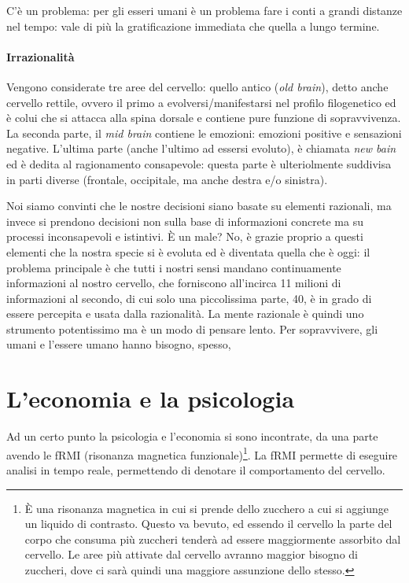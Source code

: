 C'è un problema: per gli esseri umani è un problema fare i conti a grandi
distanze nel tempo: vale di più la gratificazione immediata che quella a lungo
termine.

\paragraph*{Irrazionalità} Vengono considerate tre aree del cervello: quello
antico (\textit{old brain}), detto anche cervello rettile, ovvero il primo a
evolversi/manifestarsi nel profilo filogenetico ed è colui che si attacca alla
spina dorsale e contiene pure funzione di sopravvivenza. La seconda parte, il
\textit{mid brain} contiene le emozioni: emozioni positive e sensazioni
negative. L'ultima parte (anche l'ultimo ad essersi evoluto), è chiamata
\textit{new bain} ed è dedita al ragionamento consapevole: questa parte è
ulteriolmente suddivisa in parti diverse (frontale, occipitale, ma anche destra
e/o sinistra).

Noi siamo convinti che le nostre decisioni siano basate su elementi razionali,
ma invece si prendono decisioni non sulla base di informazioni concrete ma su
processi inconsapevoli e istintivi.
È un male? No, è grazie proprio a questi elementi che la nostra specie si è
evoluta ed è diventata quella che è oggi: il problema principale è che tutti i
nostri sensi mandano continuamente informazioni al nostro cervello, che
forniscono all'incirca 11 milioni di informazioni al secondo, di cui solo una
piccolissima parte, 40,  è in grado di essere percepita e usata dalla
razionalità. La mente razionale è quindi uno strumento potentissimo ma è un
modo di pensare lento. Per sopravvivere, gli umani e l'essere umano hanno
bisogno, spesso,

\section{L'economia e la psicologia}

Ad un certo punto la psicologia e l'economia si sono incontrate, da una parte
avendo le fRMI (risonanza magnetica funzionale)\footnote{È una risonanza
magnetica in cui si prende dello zucchero a cui si aggiunge un liquido di
contrasto. Questo va bevuto, ed essendo il cervello la parte del corpo che
consuma più zuccheri tenderà ad essere maggiormente assorbito dal cervello. Le
aree più attivate dal cervello avranno maggior bisogno di zuccheri, dove ci
sarà quindi una maggiore assunzione dello stesso.}. La fRMI permette di
eseguire analisi in tempo reale, permettendo di denotare il comportamento del
cervello.

